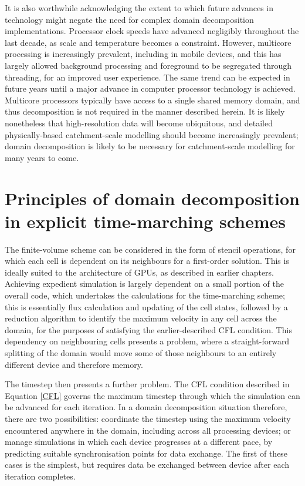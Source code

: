 It is also worthwhile acknowledging the extent to which future advances in technology might negate the need for complex domain decomposition implementations. Processor clock speeds have advanced negligibly throughout the last decade, as scale and temperature becomes a constraint. However, multicore processing is increasingly prevalent, including in mobile devices, and this has largely allowed background processing and foreground to be segregated through threading, for an improved user experience. The same trend can be expected in future years until a major advance in computer processor technology is achieved. Multicore processors typically have access to a single shared memory domain, and thus decomposition is not required in the manner described herein. It is likely nonetheless that high-resolution data will become ubiquitous, and detailed physically-based catchment-scale modelling should become increasingly prevalent; domain decomposition is likely to be necessary for catchment-scale modelling for many years to come.

\section{Principles of domain decomposition in explicit time-marching schemes}

The finite-volume scheme can be considered in the form of stencil operations, for which each cell is dependent on its neighbours for a first-order solution. This is ideally suited to the architecture of GPUs, as described in earlier chapters. Achieving expedient simulation is largely dependent on a small portion of the overall code, which undertakes the calculations for the time-marching scheme; this is essentially flux calculation and updating of the cell states, followed by a reduction algorithm to identify the maximum velocity in any cell across the domain, for the purposes of satisfying the earlier-described CFL condition. This dependency on neighbouring cells presents a problem, where a straight-forward splitting of the domain would move some of those neighbours to an entirely different device and therefore memory.

The timestep then presents a further problem. The CFL condition described in Equation \ref{CFL} governs the maximum timestep through which the simulation can be advanced for each iteration. In a domain decomposition situation therefore, there are two possibilities: coordinate the timestep using the maximum velocity encountered anywhere in the domain, including across all processing devices; or manage simulations in which each device progresses at a different pace, by predicting suitable synchronisation points for data exchange. The first of these cases is the simplest, but requires data be exchanged between device after each iteration completes.

